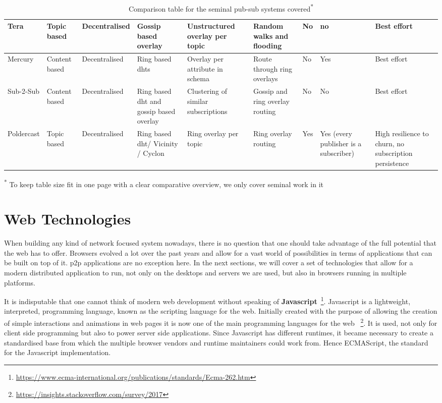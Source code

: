 \begin{table}
\begin{tabular}{|P{3cm}|P{2cm}P{2cm}P{2cm}P{2.5cm}P{2cm}P{2cm}P{2cm}P{2cm}|}
    Tera \cite{Baldoni2007} & Topic based & Decentralised & Gossip based overlay & Unstructured overlay per topic & Random walks and flooding & No & no & Best effort \\\hline
    Mercury \cite{Bharambe2002} & Content based & Decentralised & Ring based \acrshort{dht}s & Overlay per attribute in schema & Route through ring overlays & No & Yes & Best effort \\\hline
    Sub-2-Sub \cite{Voulgaris2005} & Content based & Decentralised & Ring based \acrshort{dht} and gossip based overlay & Clustering of similar subscriptions & Gossip and ring overlay routing & No & No & Best effort \\\hline
    Poldercast \cite{Setty2012} & Topic based & Decentralised & Ring based \acrshort{dht}/ Vicinity / Cyclon & Ring overlay per topic & Ring overlay routing & Yes & Yes (every publisher is a subscriber) & High resilience to churn, no subscription persistence \\\hline
    \end{tabular}
    \caption{Comparison table for the seminal pub-sub systems covered\textsuperscript{*}}
    \small\textsuperscript{*} To keep table size fit in one page with a clear comparative overview, we only cover seminal work in it
  \label{table:relevant-systems}
\end{table}

\section{Web Technologies}\label{web-technologies}

When building any kind of network focused system nowadays, there is no question
that one should take advantage of the full potential that the web has to offer.
Browsers evolved a lot over the past years and allow for a vast world of
possibilities in terms of applications that can be built on top of it. \acrshort{p2p}
applications are no exception here. In the next sections, we will cover a set
of technologies that allow for a modern distributed application to run, not
only on the desktops and servers we are used, but also in browsers running in
multiple platforms.

It is indisputable that one cannot think of modern web development
without speaking of \textbf{Javascript}~\footnote{\url{https://www.ecma-international.org/publications/standards/Ecma-262.htm}}.
Javascript is a lightweight, interpreted, programming language, known as
the scripting language for the web. Initially created with the purpose
of allowing the creation of simple interactions and animations in web
pages it is now one of the main programming languages for the web
~\footnote{\url{https://insights.stackoverflow.com/survey/2017}}. It is used, not
only for client side programming but also to power server side
applications. Since Javascript has different runtimes, it became
necessary to create a standardised base from which the multiple browser
vendors and runtime maintainers could work from. Hence ECMAScript, the standard
for the Javascript implementation.

